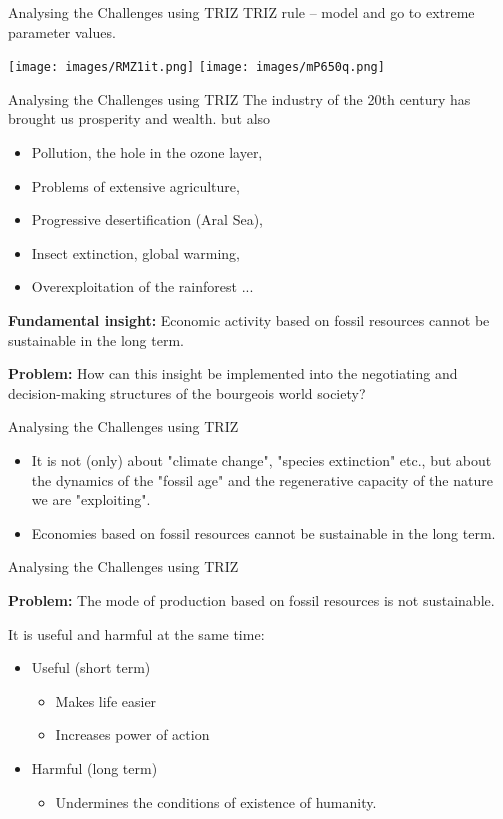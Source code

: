 \documentclass{beamer}
\begin{document}
\begin{frame}{Analysing the Challenges using TRIZ}
  TRIZ rule -- model and go to extreme parameter values.
  \begin{center}
    \texttt{[image: images/RMZ1it.png]}\hfill
    \texttt{[image: images/mP650q.png]}
  \end{center}
\end{frame}

\begin{frame}{Analysing the Challenges using TRIZ}
  The industry of the 20th century has brought us prosperity and wealth.  but
  also
\begin{itemize}
\item Pollution, the hole in the ozone layer,
\item Problems of extensive agriculture,
\item Progressive desertification (Aral Sea),
\item Insect extinction, global warming,
\item Overexploitation of the rainforest ...
\end{itemize}

\textbf{Fundamental insight:} Economic activity based on fossil resources
cannot be sustainable in the long term.

\textbf{Problem:} How can this insight be implemented into the negotiating and
decision-making structures of the bourgeois world society?
\end{frame}

\begin{frame}{Analysing the Challenges using TRIZ}
  \begin{itemize}
  \item It is not (only) about "climate change", "species extinction" etc.,
    but about the dynamics of the "fossil age" and the regenerative capacity
    of the nature we are "exploiting".
  \item Economies based on fossil resources cannot be sustainable in the
    long term.  
  \end{itemize}
\end{frame}

\begin{frame}{Analysing the Challenges using TRIZ}
  
\textbf{Problem:} The mode of production based on fossil resources is not
sustainable.

It is useful and harmful at the same time:
\begin{itemize}
\item Useful (short term)
  \begin{itemize}
  \item Makes life easier
  \item Increases power of action
  \end{itemize}
\item Harmful (long term)
  \begin{itemize}
  \item Undermines the conditions of existence of humanity.
  \end{itemize}
\end{itemize}
\end{frame}
\end{document}
